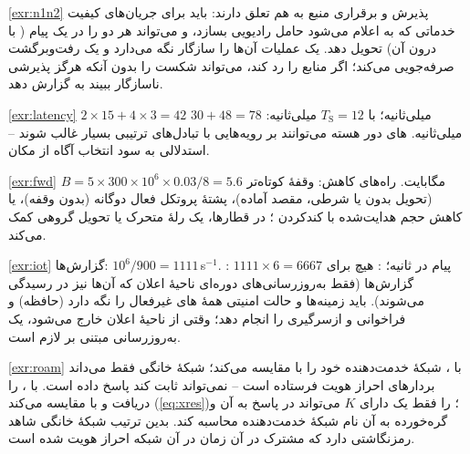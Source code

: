 \documentclass[11pt,a4paper]{article}
\begin{document}
\begin{solutionbox}{\ref{exr:n1n2}}
پذیرش  و برقراری منبع  به هم تعلق دارند:  باید برای جریان‌های کیفیت خدماتی که به  اعلام
می‌شود حامل رادیویی بسازد، و  می‌تواند هر دو را در یک پیام  ( با 
درون آن) تحویل دهد. یک عملیات آن‌ها را سازگار نگه می‌دارد و یک رفت‌وبرگشت صرفه‌جویی می‌کند؛ اگر  منابع را رد کند،
 می‌تواند شکست را بدون آنکه  هرگز پذیرشی ناسازگار ببیند به  گزارش دهد.
\end{solutionbox}

\begin{solutionbox}{\ref{exr:latency}}
$2\times15 + 4\times3 = 42$ میلی‌ثانیه؛ با $T_{\mathrm{S}} = 12$ میلی‌ثانیه: $30 + 48 = 78$ میلی‌ثانیه. های دور هسته می‌توانند بر
رویه‌هایی با تبادل‌های ترتیبی بسیار غالب شوند -- استدلالی به سود انتخاب  آگاه از مکان.
\end{solutionbox}

\begin{solutionbox}{\ref{exr:fwd}}
$B = 5\times300\times10^6\times0.03/8 = 5.6$ مگابایت. راه‌های کاهش: وقفهٔ کوتاه‌تر (تحویل بدون  یا شرطی، مقصد آماده)، پشتهٔ
پروتکل فعال دوگانه (بدون وقفه)، یا کاهش حجم هدایت‌شده با کندکردن ؛ در قطارها، یک رلهٔ متحرک یا تحویل گروهی کمک می‌کند.
\end{solutionbox}

\begin{solutionbox}{\ref{exr:iot}}
گزارش‌ها: $10^6/900 = 1111$\,s$^{-1}$. : $1111\times6 = 6667$ پیام  در ثانیه؛ : هیچ برای گزارش‌ها
(فقط به‌روزرسانی‌های دوره‌ای ناحیهٔ اعلان  که آن‌ها نیز در  رسیدگی می‌شوند).  باید زمینه‌ها و حالت امنیتی
همهٔ های غیرفعال را نگه دارد (حافظه) و فراخوانی و ازسرگیری  را انجام دهد؛ وقتی  از ناحیهٔ اعلان 
خارج می‌شود، یک به‌روزرسانی مبتنی بر  لازم است.
\end{solutionbox}

\begin{solutionbox}{\ref{exr:roam}}
با ، شبکهٔ خدمت‌دهنده خود  را با  مقایسه می‌کند؛ شبکهٔ خانگی فقط می‌داند بردارهای احراز هویت فرستاده
است -- نمی‌تواند ثابت کند  پاسخ داده است. با ،   را دریافت و با  مقایسه می‌کند
(\cref{eq:xres})؛  را فقط یک  دارای $K$ می‌تواند در پاسخ به آن  و گره‌خورده به آن نام شبکهٔ خدمت‌دهنده
محاسبه کند. بدین ترتیب شبکهٔ خانگی شاهد رمزنگاشتی دارد که مشترک در آن زمان در آن شبکه احراز هویت شده است.
\end{solutionbox}
\end{document}
